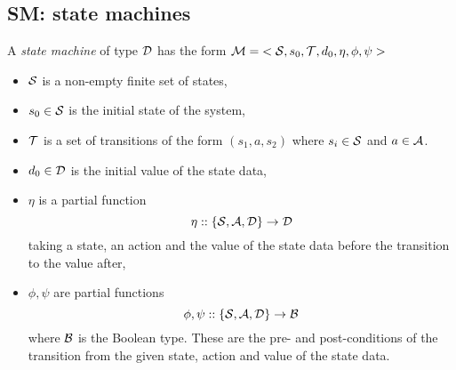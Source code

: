 \documentclass[12pt]{article}
\begin{document}
\subsection{SM: state machines}

A \emph{state machine} of type $\cal D$ has the form ${\cal{M}} = \;<{\cal{S}}, s_0, {\cal T}, d_0, \eta, \phi, \psi>$
\begin{itemize}
\item
$\cal{S}$ is a non-empty finite set of states,
\item
$s_0 \in \cal{S}$ is the initial state of the system,
\item
$\cal{T}$ is a set of transitions of the form $(s_1,a,s_2)$ where $s_i \in \cal{S}$ and $a \in \cal{A}$.
\item
$d_0 \in \cal D$ is the initial value of the state data,
\item
$\eta$ is a partial function
\[
\eta :: \{{\cal S},{\cal A},{\cal D}\} \rightarrow \cal D
\]
taking a state, an action and the value of the state data before the transition to the value after,
\item
$\phi, \psi$ are partial functions
\[
\phi, \psi :: \{{\cal S},{\cal A},{\cal D}\} \rightarrow \cal B
\]
where $\cal B$ is the Boolean type. These are the pre- and post-conditions of the transition from the given state, action and value of the state data.

\end{itemize}
\end{document}
